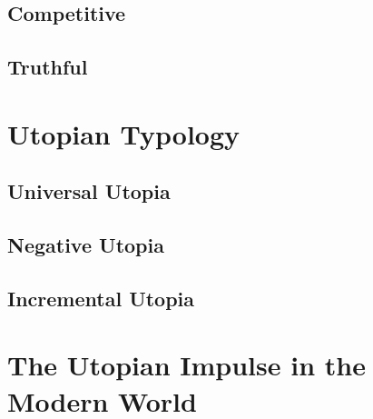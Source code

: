 \documentclass[12pt]{article}
\begin{document}
\subsection{Competitive}

\subsection{Truthful}

\section{Utopian Typology}
\subsection{Universal Utopia}
\subsection{Negative Utopia}
\subsection{Incremental Utopia}

\section{The Utopian Impulse in the Modern World}
\end{document}
